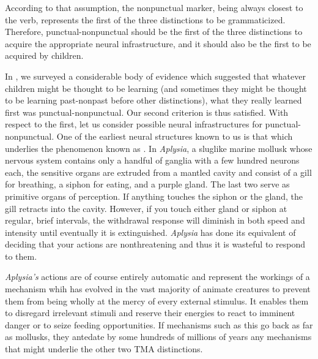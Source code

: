 According to that assumption, the nonpunctual marker, being always closest to the verb, represents the first of the three distinctions to be grammaticized. Therefore, punctual-nonpunctual should be the first of the three distinctions to acquire the appropriate neural infrastructure, and it should also be the first to be acquired by children.

In , we surveyed a considerable body of evidence which suggested that whatever children might be thought to be learning (and sometimes they might be thought to be learning past-nonpast before other distinctions), what they really learned first was punctual-nonpunctual. Our second criterion is thus satisfied. With respect to the first, let us consider possible neural infrastructures for punctual-nonpunctual. One of the earliest neural structures known to us is that which underlies the phenomenon known as \textit{}. In \textit{Aplysia}, a sluglike marine mollusk whose nervous system contains only a handful of ganglia with a few hundred neurons each, the sensitive organs are extruded from a mantled cavity and consist of a gill for breathing, a siphon for eating, and a purple gland. The last two serve as primitive organs of perception. If anything touches the siphon or the gland, the gill retracts into the cavity. However, if you touch either gland or siphon at regular, brief intervals, the withdrawal response will diminish in both speed and intensity until eventually it is extinguished. \textit{Aplysia} has done its equivalent of deciding that your actions are nonthreatening and thus it is wasteful to respond to them.

\textit{Aplysia's} actions are of course entirely automatic and represent the workings of a mechanism whih has evolved in the vast majority of
animate creatures to prevent them from being wholly at the mercy of every external stimulus. It enables them to disregard irrelevant stimuli and reserve their energies to react to imminent danger or to seize feeding opportunities. If mechanisms such as this go back as far as mollusks, they antedate by some hundreds of millions of years any mechanisms that might underlie the other two TMA distinctions.

